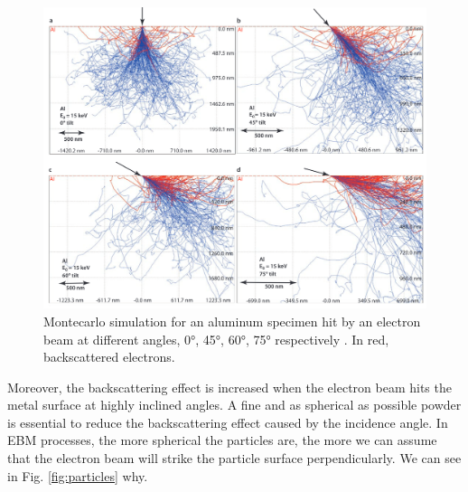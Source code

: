 \begin{figure}
    \centering
    \includegraphics[scale=0.35]{Images/backscattering.png}
    \caption[Backscattering of an electron at different angles.]{Montecarlo simulation for an aluminum specimen hit by an electron beam at different angles, \ang{0}, \ang{45}, \ang{60}, \ang{75} respectively \cite{goldstein_scanning_2018}. In red, backscattered electrons.}
    \label{fig:backscattering}
\end{figure}
Moreover, the backscattering effect is increased when the electron beam hits the metal surface at highly inclined angles. A fine and as spherical as possible powder is essential to reduce the backscattering effect caused by the incidence angle. In EBM processes, the more spherical the particles are, the more we can assume that the electron beam will strike the particle surface perpendicularly. We can see in Fig. \ref{fig:particles} why.
